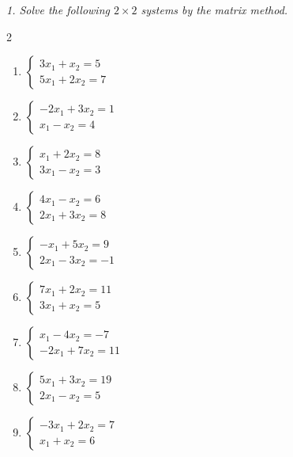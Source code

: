 \emph{1. Solve the following $2\times 2$ systems by the matrix method.}
\bigskip
\begin{multicols}{2}\raggedright
\begin{enumerate}[label=\arabic*., leftmargin=*]

\item $\begin{cases}3x_1+x_2=5\\5x_1+2x_2=7\end{cases}$

\item $\begin{cases}-2x_1+3x_2=1\\x_1-x_2=4\end{cases}$

\item $\begin{cases}x_1+2x_2=8\\3x_1-x_2=3\end{cases}$

\item $\begin{cases}4x_1-x_2=6\\2x_1+3x_2=8\end{cases}$

\item $\begin{cases}-x_1+5x_2=9\\2x_1-3x_2=-1\end{cases}$

\item $\begin{cases}7x_1+2x_2=11\\3x_1+x_2=5\end{cases}$

\item $\begin{cases}x_1-4x_2=-7\\-2x_1+7x_2=11\end{cases}$

\item $\begin{cases}5x_1+3x_2=19\\2x_1-x_2=5\end{cases}$

\item $\begin{cases}-3x_1+2x_2=7\\x_1+x_2=6\end{cases}$


\end{enumerate}
\end{multicols}
